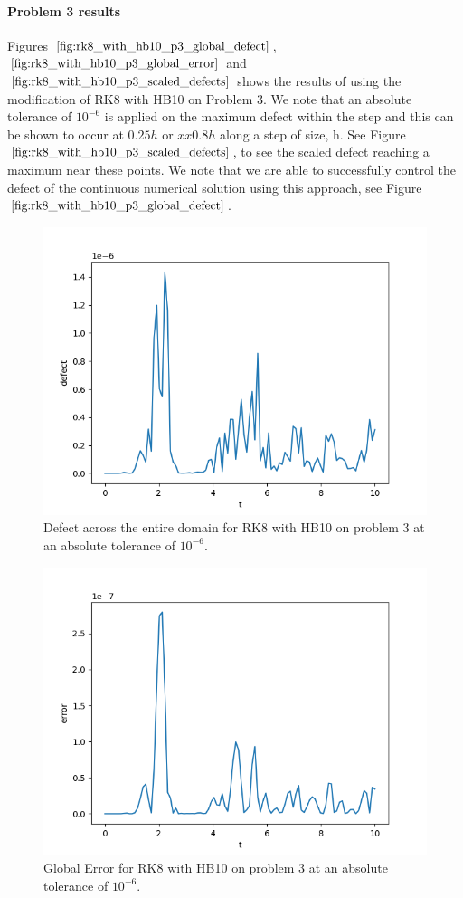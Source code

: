 \paragraph{Problem 3 results}
Figures $\ref{fig:rk8_with_hb10_p3_global_defect}$, $\ref{fig:rk8_with_hb10_p3_global_error}$ and $\ref{fig:rk8_with_hb10_p3_scaled_defects}$ shows the results of using the modification of RK8 with HB10 on Problem 3. 
We note that an absolute tolerance of $10^{-6}$ is applied on the maximum defect within the step and this can be shown to occur at $0.25h$ or $xx0.8h$ along a step of size, h. See Figure $\ref{fig:rk8_with_hb10_p3_scaled_defects}$, to see the scaled defect reaching a maximum near these points. We note that we are able to successfully control the defect of the continuous numerical solution using this approach, see Figure $\ref{fig:rk8_with_hb10_p3_global_defect}$. 


\begin{figure}[H]
\centering
\includegraphics[width=0.7\linewidth]{./figures/rk8_with_hb10_p3_global_defect}
\caption{Defect across the entire domain for RK8 with HB10 on problem 3 at an absolute tolerance of $10^{-6}$.}
\label{fig:rk8_with_hb10_p3_global_defect}
\end{figure}

\begin{figure}[H]
\centering
\includegraphics[width=0.7\linewidth]{./figures/rk8_with_hb10_p3_global_error}
\caption{Global Error for RK8 with HB10 on problem 3 at an absolute tolerance of $10^{-6}$.}
\label{fig:rk8_with_hb10_p3_global_error}
\end{figure}

